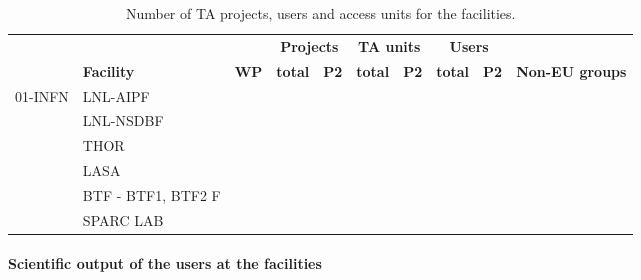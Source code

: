 \begin{table}[H]
\caption{Number of TA projects, users and access units for the facilities.}
\centering
\begin{tabularx}{\textwidth}{|l|l|c|c|c|c|c|c|c|X|} \hline
    \rowcolor{mycyan}
    & & & \multicolumn{2}{|c|}{\textbf{Projects}} & 
    \multicolumn{2}{|c|}{\textbf{TA units}} & 
    \multicolumn{2}{|c|}{\textbf{Users}} & \\ \cline{4-9}
    \rowcolor{mycyan}
    \multirow{-2}{*}{\textbf{Provider}} &
    \multirow{-2}{*}{\textbf{Facility}} & 
    \multirow{-2}{*}{\textbf{WP}} &
    \textbf{total} & \textbf{P2} & 
    \textbf{total} & \textbf{P2} & 
    \textbf{total} & \textbf{P2} &
    \multirow{-2}{\hsize}{\textbf{Non-EU groups}} \\ \hline
    01-INFN                    & LNL-AIPF  & & & & & & & & \\ \cline{2-10}
                               & LNL-NSDBF & & & & & & & & \\ \cline{2-10}
                               & THOR & & & & & & & & \\ \cline{2-10}
                               & LASA & & & & & & & & \\ \cline{2-10}
                               & BTF - BTF1, BTF2 F & & & & & & & & \\ \cline{2-10}
                               & SPARC LAB & & & & & & & & \\ \hline                
\end{tabularx}
\label{tab:ta-projects}
\end{table}


\paragraph{Scientific output of the users at the facilities}






